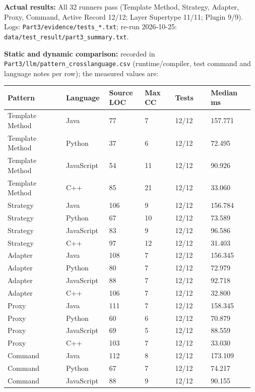 \documentclass[11pt,a4paper]{article}
\newcommand{\field}[2]{\textbf{#1:} #2\par}
\begin{document}
\field{Actual results}{All 32 runners pass (Template Method, Strategy, Adapter, Proxy, Command, Active Record 12/12; Layer Supertype 11/11; Plugin 9/9). Logs: \texttt{Part3/\allowbreak{}evidence/\allowbreak{}tests\_\allowbreak{}*.\allowbreak{}txt}; re-run 2026-10-25: \texttt{data/\allowbreak{}test\_\allowbreak{}result/\allowbreak{}part3\_\allowbreak{}summary.\allowbreak{}txt}.}
\field{Static and dynamic comparison}{recorded in \texttt{Part3/\allowbreak{}llm/\allowbreak{}pattern\_\allowbreak{}crosslanguage.\allowbreak{}csv} (runtime/compiler, test command and language notes per row); the measured values are:}
{\small\setlength{\tabcolsep}{3pt}
\begin{longtable}{@{}P{0.23\linewidth}P{0.17\linewidth}P{0.14\linewidth}P{0.12\linewidth}P{0.14\linewidth}P{0.17\linewidth}@{}}\toprule
\textbf{Pattern} & \textbf{Language} & \textbf{Source LOC} & \textbf{Max CC} & \textbf{Tests} & \textbf{Median ms} \\ \midrule\endhead
Template Method & Java & 77 & 7 & 12/12 & 157.771 \\
Template Method & Python & 37 & 6 & 12/12 & 72.495 \\
Template Method & JavaScript & 54 & 11 & 12/12 & 90.926 \\
Template Method & C++ & 85 & 21 & 12/12 & 33.060 \\
Strategy & Java & 106 & 9 & 12/12 & 156.784 \\
Strategy & Python & 67 & 10 & 12/12 & 73.589 \\
Strategy & JavaScript & 83 & 9 & 12/12 & 96.586 \\
Strategy & C++ & 97 & 12 & 12/12 & 31.403 \\
Adapter & Java & 108 & 7 & 12/12 & 156.345 \\
Adapter & Python & 80 & 7 & 12/12 & 72.979 \\
Adapter & JavaScript & 88 & 7 & 12/12 & 92.718 \\
Adapter & C++ & 106 & 7 & 12/12 & 32.800 \\
Proxy & Java & 111 & 7 & 12/12 & 158.345 \\
Proxy & Python & 60 & 6 & 12/12 & 70.879 \\
Proxy & JavaScript & 69 & 5 & 12/12 & 88.559 \\
Proxy & C++ & 103 & 7 & 12/12 & 33.030 \\
Command & Java & 112 & 8 & 12/12 & 173.109 \\
Command & Python & 67 & 7 & 12/12 & 74.217 \\
Command & JavaScript & 88 & 9 & 12/12 & 90.155 \\

\end{longtable}}
\end{document}
